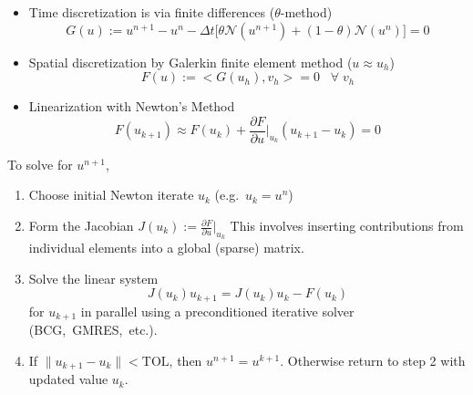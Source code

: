 \documentclass[compress,12pt]{beamer}
\begin{document}
\begin{frame}%
   \begin{itemize}
     \item Time discretization is via finite differences ($\theta$-method)
       \begin{equation}
	 \label{eqn:theta}
	 \nonumber
	 G(u) := u^{n+1} - u^n - \Delta t \Big[ \theta \mathcal{N}( u^{n+1} )
 	   + (1-\theta)\mathcal{N}( u^{n} )\Big] = 0
       \end{equation}
     \item Spatial discretization by Galerkin finite element method ($u \approx u_h$)
       \begin{equation}
	 \label{eqn:galerkin}
	 \nonumber
	 F(u) := <G(u_h), v_h> = 0 \;\;\; \forall \; v_h
       \end{equation}
     \item Linearization with Newton's Method
       \begin{equation}
	 \nonumber
	 F(u_{k+1}) \approx F(u_{k}) +
	 \frac{\partial F}{\partial u}\Big|_{u_k} (u_{k+1} - u_k) = 0
       \end{equation}
   \end{itemize}
\end{frame}


\begin{frame}%
  To solve for $u^{n+1}$, 
  \begin{enumerate}
    
    \item Choose initial Newton iterate $u_k$ (e.g.\ $u_k = u^n$)
    \item Form the Jacobian $J(u_k) := \frac{\partial F}{\partial u}\big|_{u_k}$
      This involves inserting contributions from individual elements into
      a global (sparse) matrix.
    \item Solve the linear system
      \begin{equation}
	\label{eqn:linearsystem}
	\nonumber
	J(u_k)u_{k+1} =  J(u_k)u_{k} - F(u_{k})
      \end{equation}
      for $u_{k+1}$ in parallel using a preconditioned iterative solver \mbox{(BCG, GMRES, etc.)}.
    \item If $\|u_{k+1} -  u_{k}\| < \text{TOL}$, then $u^{n+1} = u^{k+1}$.  Otherwise
      return to step 2 with updated value $u_{k}$.
  \end{enumerate}
\end{frame}
\end{document}
